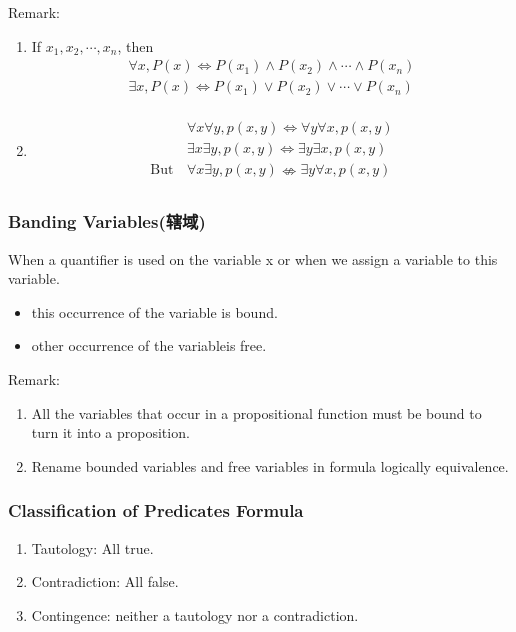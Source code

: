 Remark:
\begin{enumerate}
    \item If $x_1, x_2, \cdots, x_n$, then
    \begin{align*}
        \forall x, P(x) \Longleftrightarrow P(x_1) \land P(x_2) \land \cdots \land P(x_n)\\
        \exists x, P(x) \Longleftrightarrow P(x_1) \lor P(x_2) \lor \cdots \lor P(x_n)\\
    \end{align*}
    \item \begin{align*}
        &\forall x\forall y, p(x,y)\Longleftrightarrow \forall y\forall x, p(x,y)\\
        &\exists x\exists y, p(x,y)\Longleftrightarrow \exists y\exists x, p(x,y)\\
        \text{But}\,&\forall x\exists y, p(x,y)\nLeftrightarrow  \exists y\forall x, p(x,y)\\
    \end{align*}
\end{enumerate}

\subsubsection{Banding Variables(辖域)}

\begin{definition}
    When a quantifier is used on the variable x or when we assign a variable to this variable.
    \begin{itemize}
        \item this occurrence of the variable is bound.
        \item other occurrence of the variableis free.
    \end{itemize}
\end{definition}

Remark:
\begin{enumerate}
    \item All the variables that occur in a propositional function must be bound to turn it into a proposition. 
    \item Rename bounded variables and free variables in formula logically equivalence. 
\end{enumerate}

\subsubsection{Classification of Predicates Formula}
\begin{enumerate}
    \item Tautology: All true.
    \item Contradiction: All false.
    \item Contingence: neither a tautology nor a contradiction. 
\end{enumerate}


